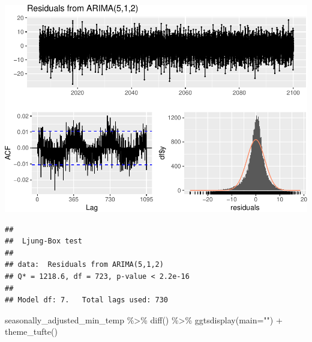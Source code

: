 \documentclass[
  paper=a4,
  ,captions=tableheading
]{scrartcl}
\newenvironment{Shaded}{\begin{snugshade}}{\end{snugshade}}
\newcommand{\AttributeTok}[1]{\textcolor[rgb]{0.77,0.63,0.00}{#1}}
\newcommand{\FunctionTok}[1]{\textcolor[rgb]{0.00,0.00,0.00}{#1}}
\newcommand{\NormalTok}[1]{#1}
\newcommand{\SpecialCharTok}[1]{\textcolor[rgb]{0.00,0.00,0.00}{#1}}
\newcommand{\StringTok}[1]{\textcolor[rgb]{0.31,0.60,0.02}{#1}}
\begin{document}
\includegraphics{Haskell_files/figure-latex/unnamed-chunk-61-1.pdf}

\begin{verbatim}
## 
##  Ljung-Box test
## 
## data:  Residuals from ARIMA(5,1,2)
## Q* = 1218.6, df = 723, p-value < 2.2e-16
## 
## Model df: 7.   Total lags used: 730
\end{verbatim}

\begin{Shaded}
\begin{Highlighting}[]
\NormalTok{seasonally\_adjusted\_min\_temp }\SpecialCharTok{\%\textgreater{}\%} \FunctionTok{diff}\NormalTok{() }\SpecialCharTok{\%\textgreater{}\%} \FunctionTok{ggtsdisplay}\NormalTok{(}\AttributeTok{main=}\StringTok{""}\NormalTok{) }\SpecialCharTok{+} \FunctionTok{theme\_tufte}\NormalTok{()}
\end{Highlighting}
\end{Shaded}
\end{document}
